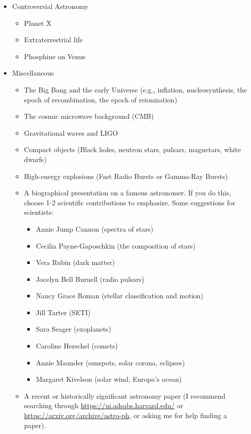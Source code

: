 \documentclass[11pt]{article}
\begin{document}
\begin{itemize}[noitemsep]
    \item Controversial Astronomy
        \begin{itemize}[noitemsep]
            \item Planet X
            \item Extraterrestrial life 
            \item Phosphine on Venus
        \end{itemize}

    \item Miscellaneous
        \begin{itemize}[noitemsep]
            \item The Big Bang and the early Universe (e.g., inflation, nucleosynthesis, the epoch of recombination, the epoch of reionization)
            \item The cosmic microwave background (CMB)
            \item Gravitational waves and LIGO
            \item Compact objects (Black holes, neutron stars, pulsars, magnetars, white dwarfs)
            \item High-energy explosions (Fast Radio Bursts or Gamma-Ray Bursts)
            \item A biographical presentation on a famous astronomer. If you do this, choose 1-2 scientific contributions to emphasize. Some suggestions for scientists:
            \begin{itemize}[noitemsep]
                \item Annie Jump Cannon (spectra of stars)
                \item Cecilia Payne-Gaposchkin (the composition of stars)
                \item Vera Rubin (dark matter)
                \item Jocelyn Bell Burnell (radio pulsars)
                \item Nancy Grace Roman (stellar classification and motion)
                \item Jill Tarter (SETI)
                \item Sara Seager (exoplanets)
                \item Caroline Herschel (comets)
                \item Annie Maunder (sunspots, solar corona, eclipses)
                \item Margaret Kivelson (solar wind, Europa’s ocean)
                
            \end{itemize}
            
            \item A recent or historically significant astronomy paper (I recommend searching through \url{https://ui.adsabs.harvard.edu/} or \url{https://arxiv.org/archive/astro-ph}, or asking me for help finding a paper).
        \end{itemize}
        
\end{itemize}
\end{document}
